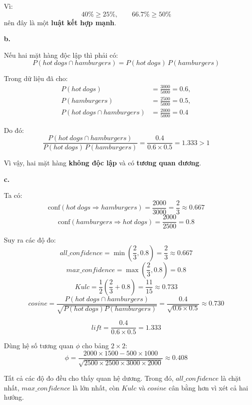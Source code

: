 Vì:
\[
    40\% \ge 25\%, \qquad 66.7\% \ge 50\%
\]
nên đây là một \textbf{luật kết hợp mạnh}.

\bigskip

\noindent \textbf{b.}

Nếu hai mặt hàng độc lập thì phải có:
\[
    P(hot\ dogs \cap hamburgers)=P(hot\ dogs)\,P(hamburgers)
\]

Trong dữ liệu đã cho:
\[
    \begin{aligned}
        P(hot\ dogs)                 & =\frac{3000}{5000}=0.6, \\
        P(hamburgers)               & =\frac{2500}{5000}=0.5, \\
        P(hot\ dogs \cap hamburgers) & =\frac{2000}{5000}=0.4
    \end{aligned}
\]

Do đó:
\[
    \frac{P(hot\ dogs \cap hamburgers)}{P(hot\ dogs)\,P(hamburgers)}
    =
    \frac{0.4}{0.6 \times 0.5}
    =
    1.333 > 1
\]

Vì vậy, hai mặt hàng \textbf{không độc lập} và có \textbf{tương quan dương}.

\bigskip

\noindent \textbf{c.}

Ta có:
\[
    \mathrm{conf}(hot\ dogs \Rightarrow hamburgers)=\frac{2000}{3000}=\frac{2}{3}\approx 0.667
\]
\[
    \mathrm{conf}(hamburgers \Rightarrow hot\ dogs)=\frac{2000}{2500}=0.8
\]

Suy ra các độ đo:
\[
    all\_confidence = \min\left(\frac{2}{3},0.8\right)=\frac{2}{3}\approx 0.667
\]
\[
    max\_confidence = \max\left(\frac{2}{3},0.8\right)=0.8
\]
\[
    Kulc = \frac{1}{2}\left(\frac{2}{3}+0.8\right)=\frac{11}{15}\approx 0.733
\]
\[
    cosine = \frac{P(hot\ dogs \cap hamburgers)}{\sqrt{P(hot\ dogs)P(hamburgers)}}
    = \frac{0.4}{\sqrt{0.6 \times 0.5}}
    \approx 0.730
\]

\[
    lift = \frac{0.4}{0.6 \times 0.5}=1.333
\]

Dùng hệ số tương quan $\phi$ cho bảng $2 \times 2$:
\[
    \phi
    =
    \frac{2000 \times 1500 - 500 \times 1000}
    {\sqrt{2500 \times 2500 \times 3000 \times 2000}}
    \approx 0.408
\]

Tất cả các độ đo đều cho thấy quan hệ dương. Trong đó, $all\_confidence$ là chặt nhất, $max\_confidence$ là lớn nhất, còn $Kulc$ và $cosine$ cân bằng hơn vì xét cả hai hướng.
